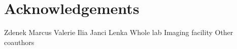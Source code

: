 \chapter*{Acknowledgements}
Zdenek
Marcus
Valerie
Ilia
Janci
Lenka
Whole lab
Imaging facility
Other coauthors
